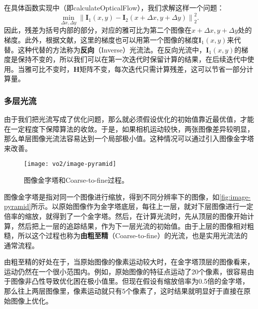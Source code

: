 在具体函数实现中（即calculateOpticalFlow），我们求解这样一个问题：
\begin{equation}
\mathop {\min }\limits_{\Delta x,\Delta y} \left\| {{\bm{I}_1}\left( {x,y} \right) - {\bm{I}_2}\left( {x + \Delta x,y + \Delta y} \right)} \right\|_2^2.
\end{equation}
因此，残差为括号内部的部分，对应的雅可比为第二个图像在$x + \Delta x,y + \Delta y$处的梯度。此外，根据文献\cite{Baker2004}，这里的梯度也可以用第一个图像的梯度$\bm{I}_1 (x,y)$来代替。这种代替的方法称为\textbf{反向}（Inverse）光流法。在反向光流中，$\bm{I}_1 (x,y)$的梯度是保持不变的，所以我们可以在第一次迭代时保留计算的结果，在后续迭代中使用。当雅可比不变时，$\bm{H}$矩阵不变，每次迭代只需计算残差，这可以节省一部分计算量。

\subsubsection{多层光流}
由于我们把光流写成了优化问题，那么就必须假设优化的初始值靠近最优值，才能在一定程度下保障算法的收敛。于是，如果相机运动较快，两张图像差异较明显，那么单层图像光流法容易达到一个局部极小值。这种情况可以通过引入图像金字塔来改善。

\begin{figure}[!htp]
	\centering
	\texttt{[image: vo2/image-pyramid]}
	\caption{图像金字塔和Coarse-to-fine过程。}
	\label{fig:image-pyramid}
\end{figure}

图像金字塔是指对同一个图像进行缩放，得到不同分辨率下的图像，如\autoref{fig:image-pyramid}所示。以原始图像作为金字塔底层，每往上一层，就对下层图像进行一定倍率的缩放，就得到了一个金字塔。然后，在计算光流时，先从顶层的图像开始计算，然后把上一层的追踪结果，作为下一层光流的初始值。由于上层的图像相对粗糙，所以这个过程也称为\textbf{由粗至精}（Coarse-to-fine）的光流，也是实用光流法的通常流程。

由粗至精的好处在于，当原始图像的像素运动较大时，在金字塔顶层的图像看来，运动仍然在一个很小范围内。例如，原始图像的特征点运动了20个像素，很容易由于图像非凸性导致优化困在极小值里。但现在假设有缩放倍率为0.5倍的金字塔，那么往上两层图像里，像素运动就只有5个像素了，这时结果就明显好于直接在原始图像上优化。

